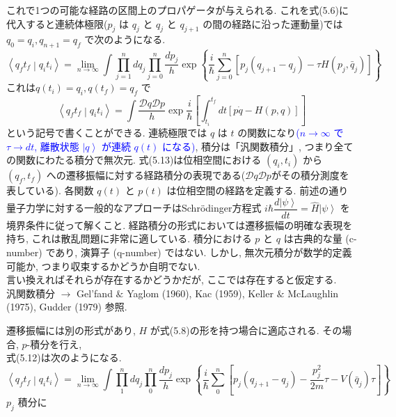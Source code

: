 \documentclass[a4paper,12pt]{article}
\newcommand{\ket}[1]{\left|#1\right\rangle}
\newcommand{\braket}[2]{\left\langle #1\middle|#2\right\rangle}
\begin{document}
これで1つの可能な経路の区間上のプロパゲータが与えられる. これを式(5.6)に代入すると連続体極限($p_{j}$ は $q_{j}$ と $q_{j}$ と $q_{j+1}$ の間の経路に沿った運動量)では $q_{0} = q_{i}, q_{n+1} = q_{f}$ で次のようになる.
\begin{equation*}
    \braket{q_{f}t_{f}}{q_{i}t_{i}} = \lim_{n \rightarrow \infty} \int \prod_{j=1}^{n} dq_{j} \prod_{j=0}^{n}\frac{dp_{j}}{h}\exp\left\{ \frac{i}{\hbar}\sum_{j=0}^{n} [p_{j}(q_{j+1} - q_{j}) - \tau H(p_{j}, \bar{q}_{j})]\right\} \tag{5.12}
\end{equation*}
これは$q(t_i) = q_{i}, q(t_{f}) = q_{f}$ で
\begin{equation*}
    \braket{q_{f}t_{f}}{q_{i}t_{i}} = \int \frac{\mathcal{D}q\mathcal{D}p}{h}\exp\frac{i}{\hbar}\left[ \int_{t_{i}}^{t_{f}} dt [p\dot{q} - H(p, q)] \right] \tag{5.13}
\end{equation*}
という記号で書くことができる. 連続極限では $q$ は $t$ の関数になり\textcolor{blue}{($n \to \infty$ で $\tau \to dt$, 離散状態 $\ket{q}$ が連続 $q(t)$ になる)}, 積分は「汎関数積分」, つまり全ての関数にわたる積分で無次元. 式(5.13)は位相空間における $(q_{i}, t_{i})$ から $(q_{f}, t_{f})$ への遷移振幅に対する経路積分の表現である\color{blue}($\mathcal{D}q\mathcal{D}p$がその積分測度を表している)\color{black}. 各関数 $q(t)$ と $p(t)$ は位相空間の経路を定義する. 前述の通り量子力学に対する一般的なアプローチはSchr\"{o}dinger方程式 $i\hbar\dfrac{d\ket{\psi}}{dt} = \hat{H}\ket{\psi}$ を境界条件に従って解くこと. 経路積分の形式においては遷移振幅の明確な表現を持ち, これは散乱問題に非常に適している. 積分における $p$ と $q$ は古典的な量 (c-number) であり, 演算子 (q-number) ではない. しかし, 無次元積分が数学的定義可能か, つまり収束するかどうか自明でない.\\
言い換えればそれらが存在するかどうかだが, ここでは存在すると仮定する.\\
汎関数積分 $\rightarrow$ Gel'fand $\&$ Yaglom (1960), Kac (1959), Keller $\&$ McLaughlin (1975), Gudder (1979) 参照. \par
遷移振幅には別の形式があり, $H$ が式(5.8)の形を持つ場合に適応される. その場合, $p$-積分を行え,\\
式(5.12)は次のようになる.
\begin{equation*}
    \braket{q_{f}t_{f}}{q_{i}t_{i}} = \lim_{n \rightarrow \infty} \int \prod_{1}^{n}dq_{j}\prod_{0}^{n}\frac{dp_{j}}{h}\exp\left\{ \frac{i}{\hbar}\sum_{0}^{n}\left[ p_{j}(q_{j+1} - q_{j}) - \frac{p^{2}_{j}}{2m}\tau - V(\bar{q}_{j})\tau \right] \right\}
\end{equation*}
$p_{j}$ 積分に
\end{document}
